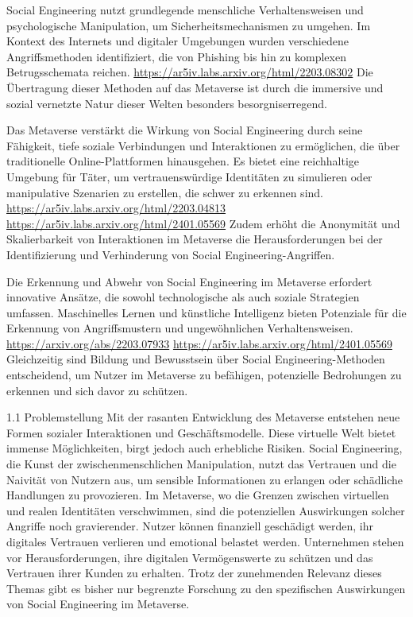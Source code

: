 Social Engineering nutzt grundlegende menschliche Verhaltensweisen und psychologische Manipulation, um Sicherheitsmechanismen zu umgehen. Im Kontext des Internets und digitaler Umgebungen wurden verschiedene Angriffsmethoden identifiziert, die von Phishing bis hin zu komplexen Betrugsschemata reichen. \url{https://ar5iv.labs.arxiv.org/html/2203.08302} Die Übertragung dieser Methoden auf das Metaverse ist durch die immersive und sozial vernetzte Natur dieser Welten besonders besorgniserregend.

Das Metaverse verstärkt die Wirkung von Social Engineering durch seine Fähigkeit, tiefe soziale Verbindungen und Interaktionen zu ermöglichen, die über traditionelle Online-Plattformen hinausgehen. Es bietet eine reichhaltige Umgebung für Täter, um vertrauenswürdige Identitäten zu simulieren oder manipulative Szenarien zu erstellen, die schwer zu erkennen sind. \url{https://ar5iv.labs.arxiv.org/html/2203.04813} \url{https://ar5iv.labs.arxiv.org/html/2401.05569} Zudem erhöht die Anonymität und Skalierbarkeit von Interaktionen im Metaverse die Herausforderungen bei der Identifizierung und Verhinderung von Social Engineering-Angriffen.

Die Erkennung und Abwehr von Social Engineering im Metaverse erfordert innovative Ansätze, die sowohl technologische als auch soziale Strategien umfassen. Maschinelles Lernen und künstliche Intelligenz bieten Potenziale für die Erkennung von Angriffsmustern und ungewöhnlichen Verhaltensweisen. \url{https://arxiv.org/abs/2203.07933} \url{https://ar5iv.labs.arxiv.org/html/2401.05569} Gleichzeitig sind Bildung und Bewusstsein über Social Engineering-Methoden entscheidend, um Nutzer im Metaverse zu befähigen, potenzielle Bedrohungen zu erkennen und sich davor zu schützen.


1.1 Problemstellung
Mit der rasanten Entwicklung des Metaverse entstehen neue Formen sozialer Interaktionen und Geschäftsmodelle. Diese virtuelle Welt bietet immense Möglichkeiten, birgt jedoch auch erhebliche Risiken. Social Engineering, die Kunst der zwischenmenschlichen Manipulation, nutzt das Vertrauen und die Naivität von Nutzern aus, um sensible Informationen zu erlangen oder schädliche Handlungen zu provozieren. Im Metaverse, wo die Grenzen zwischen virtuellen und realen Identitäten verschwimmen, sind die potenziellen Auswirkungen solcher Angriffe noch gravierender. Nutzer können finanziell geschädigt werden, ihr digitales Vertrauen verlieren und emotional belastet werden. Unternehmen stehen vor Herausforderungen, ihre digitalen Vermögenswerte zu schützen und das Vertrauen ihrer Kunden zu erhalten. Trotz der zunehmenden Relevanz dieses Themas gibt es bisher nur begrenzte Forschung zu den spezifischen Auswirkungen von Social Engineering im Metaverse.


